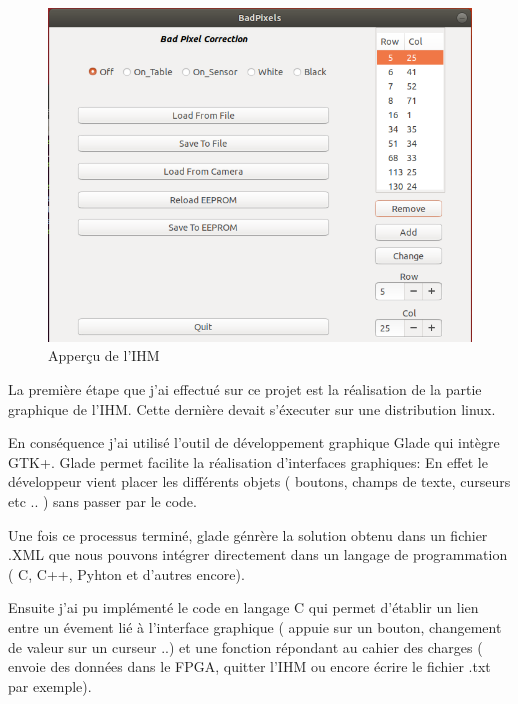 \begin{figure}[ht]
    \centering
    \includegraphics[scale=0.45]{img/IHM.png}
    \caption{Apperçu de l'IHM}
    \label{fig:CameraCmdsettings}
\end{figure}


La première étape que j'ai effectué sur ce projet est la réalisation de la partie graphique de l'IHM. Cette dernière devait s'éxecuter sur une distribution linux.

En conséquence j'ai utilisé l'outil de développement graphique Glade qui intègre GTK+. Glade permet facilite la réalisation d'interfaces graphiques: En effet le développeur vient placer les différents objets ( boutons, champs de texte, curseurs etc .. ) sans passer par le code. 

Une fois ce processus terminé, glade génrère la solution obtenu dans un fichier .XML que nous pouvons intégrer directement dans un langage de programmation ( C, C++, Pyhton et d'autres encore). 
\newline


Ensuite j'ai pu implémenté le code en langage C qui permet d'établir un lien entre un évement lié à l'interface graphique ( appuie sur un bouton, changement de valeur sur un curseur ..) et une fonction répondant au cahier des charges ( envoie des données dans le FPGA, quitter l'IHM ou encore écrire le fichier .txt par exemple). 



